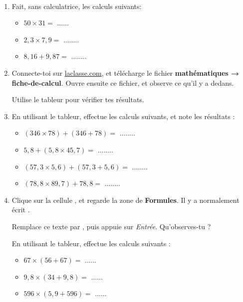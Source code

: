 \documentclass[a4paper,11pt]{article}
\begin{document}
\begin{exercice}\
	\begin{enumerate}
		\item Fait, sans calculatrice, les calculs suivants:
		      \begin{itemize}
			      \item $50 × 31 = $ ...... %
			      \item $2,3 × 7,9 = $ ........ %
			      \item $8,16 + 9,87 = $ ........ %
		      \end{itemize}
		\item Connecte-toi sur \url{laclasse.com}, et télécharge le fichier \textbf{mathématiques → fiche-de-calcul}. Ouvre ensuite ce fichier, et observe ce qu'il y a dedans. \vspace{1em}

		      Utilise le tableur pour vérifier tes résultats.
		\item En utilisant le tableur, effectue les calculs suivants, et note les résultats :
		      \begin{itemize}
			      \item $(346 × 78) + (346 + 78) = $ ........
			      \item $5,8 + (5,8 × 45,7) = $ ........
			      \item $(57,3 × 5,6) + (57,3 + 5,6) = $ ........
			      \item $(78,8 × 89,7) + 78,8 = $ ........
		      \end{itemize}
		\item Clique sur la cellule , et regarde la zone de \textbf{Formules}. Il y a normalement écrit .

		      Remplace ce texte par , puis appuie sur \textit{Entrée}. Qu'observes-tu ?

		      En utilisant le tableur, effectue les calculs suivants :
		      \begin{itemize}
			      \item $67 × (56 + 67) = $ ......

			      \item $9,8 × (34 + 9,8) = $ ......

			      \item $596 × (5,9 + 596) = $ ......
		      \end{itemize}
	\end{enumerate}
\end{exercice}
\end{document}
